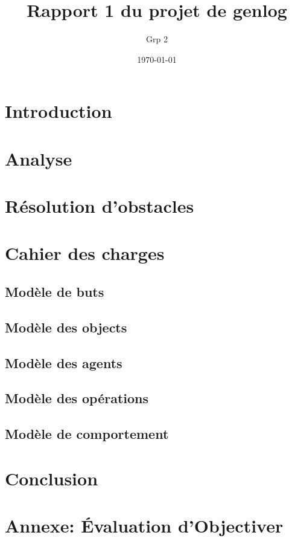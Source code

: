 \documentclass[12pt,openany]{book}
\title{Rapport 1 du projet de genlog}
\author{Grp 2}
\date{\today}
\begin{document}
\setlength{\parskip}{1em}

\maketitle
\tableofcontents

\chapter*{Introduction}
	
\chapter{Analyse}
	

\chapter{Résolution d'obstacles}
	

\chapter{Cahier des charges}
	\section{Modèle de buts}
		

	\section{Modèle des objects}
		

	\section{Modèle des agents}
		

	\section{Modèle des opérations}
		

	\section{Modèle de comportement}
		

\chapter*{Conclusion}
	

\chapter{Annexe: Évaluation d'Objectiver}
	
\end{document}
